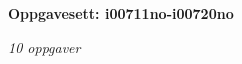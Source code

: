 \centerline{\bf Oppgavesett: i00711no-i00720no}
\vskip 10pt
\centerline{\it 10 oppgaver}\vskip 10pt
\vskip 10pt

